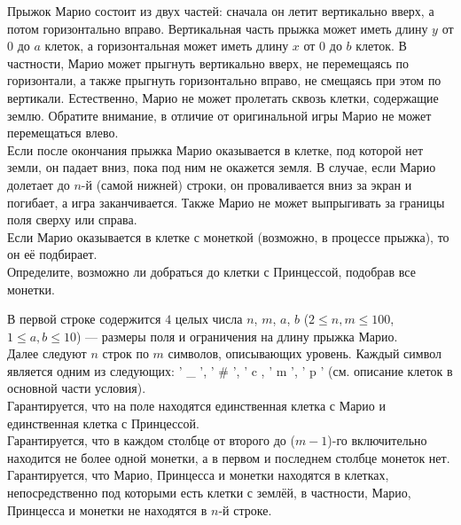 \begin{problem}
Прыжок Марио состоит из двух частей: сначала он летит вертикально вверх, а потом горизонтально вправо. Вертикальная часть прыжка может иметь длину $y$ от $0$ до $a$ клеток, а горизонтальная может иметь длину $x$ от $0$ до $b$ клеток. В частности, Марио может прыгнуть вертикально вверх, не перемещаясь по горизонтали, а также прыгнуть горизонтально вправо, не смещаясь при этом по вертикали. Естественно, Марио не может пролетать сквозь клетки, содержащие землю. Обратите внимание, в отличие от оригинальной игры Марио не может перемещаться влево.\\

Если после окончания прыжка Марио оказывается в клетке, под которой нет земли, он падает вниз, пока под ним не окажется земля. В случае, если Марио долетает до $n$-й (самой нижней) строки, он проваливается вниз за экран и погибает, а игра заканчивается. Также Марио не может выпрыгивать за границы поля сверху или справа.\\

Если Марио оказывается в клетке с монеткой (возможно, в процессе прыжка), то он её подбирает.\\

Определите, возможно ли добраться до клетки с Принцессой, подобрав все монетки.

\InputFile

В первой строке содержится $4$ целых числа $n$, $m$, $a$, $b$ ($2 \le n, m \le 100$, $1 \le a, b \le 10$) — размеры поля и ограничения на длину прыжка Марио.\\

Далее следуют $n$ строк по $m$ символов, описывающих уровень. Каждый символ является одним из следующих: ' \_ ', ' \# ', ' c , ' m ', ' p ' (см. описание клеток в основной части условия).\\

Гарантируется, что на поле находятся единственная клетка с Марио и единственная клетка с Принцессой.\\

Гарантируется, что в каждом столбце от второго до ($m - 1$)-го включительно находится не более одной монетки, а в первом и последнем столбце монеток нет.\\

Гарантируется, что Марио, Принцесса и монетки находятся в клетках, непосредственно под которыми есть клетки с землёй, в частности, Марио, Принцесса и монетки не находятся в $n$-й строке.

\OutputFile


\end{problem}
